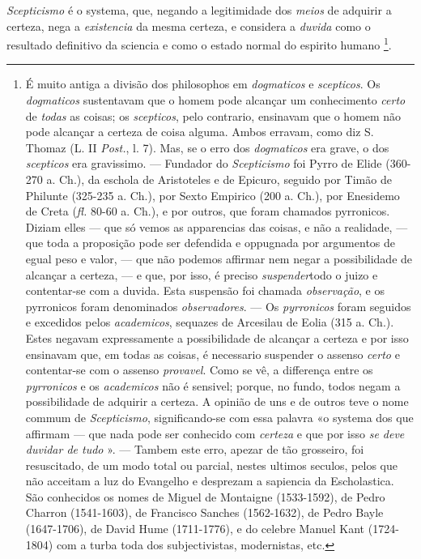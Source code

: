        
\emph{Scepticismo} é o systema, que, negando a legitimidade dos \emph{meios} de adquirir a certeza, nega a \emph{existencia} da mesma certeza, e considera a \emph{duvida} como o resultado definitivo da sciencia e como o estado normal do espirito humano \footnote{É muito antiga a divisão dos philosophos em \emph{dogmaticos} e \emph{scepticos}. Os \emph{dogmaticos} sustentavam que o homem pode alcançar um conhecimento \emph{certo} de \emph{todas} as coisas; os \emph{scepticos}, pelo contrario, ensinavam que o homem não pode alcançar a certeza de coisa alguma. Ambos erravam, como diz S. Thomaz (L. II \emph{Post.}, l. 7). Mas, se o erro dos \emph{dogmaticos} era grave, o dos \emph{scepticos} era gravissimo. --- Fundador do \emph{Scepticismo} foi Pyrro de Elide (360-270 a. Ch.), da eschola de Aristoteles e de Epicuro, seguido por Timão de Philunte (325-235 a. Ch.), por Sexto Empirico (200 a. Ch.), por Enesidemo de Creta (\emph{fl.} 80-60 a. Ch.), e por outros, que foram chamados pyrronicos. Diziam elles --- que só vemos as apparencias das coisas, e não a realidade, --- que toda a proposição pode ser defendida e oppugnada por argumentos de egual peso e valor, --- que não podemos affirmar nem negar a possibilidade de alcançar a certeza, --- e que, por isso, é preciso \emph{suspender}todo o juizo e contentar-se com a duvida. Esta suspensão foi chamada \emph{observação}, e os pyrronicos foram denominados \emph{observadores}. --- Os \emph{pyrronicos} foram seguidos e excedidos pelos \emph{academicos}, sequazes de Arcesilau de Eolia (315 a. Ch.). Estes negavam expressamente a possibilidade de alcançar a certeza e por isso ensinavam que, em todas as coisas, é necessario suspender o assenso \emph{certo} e contentar-se com o assenso \emph{provavel}. Como se vê, a differença entre os \emph{pyrronicos} e os \emph{academicos} não é sensivel; porque, no fundo, todos negam a possibilidade de adquirir a certeza. A opinião de uns e de outros teve o nome commum de \emph{Scepticismo}, significando-se com essa palavra «o systema dos que affirmam --- que nada pode ser conhecido com \emph{certeza} e que por isso \emph{se deve duvidar de tudo} ». --- Tambem este erro, apezar de tão grosseiro, foi resuscitado, de um modo total ou parcial, nestes ultimos seculos, pelos que não acceitam a luz do Evangelho e desprezam a sapiencia da Escholastica. São conhecidos os nomes de Miguel de Montaigne (1533-1592), de Pedro Charron (1541-1603), de Francisco Sanches (1562-1632), de Pedro Bayle (1647-1706), de David Hume (1711-1776), e do celebre Manuel Kant (1724-1804) com a turba toda dos subjectivistas, modernistas, etc.}.

